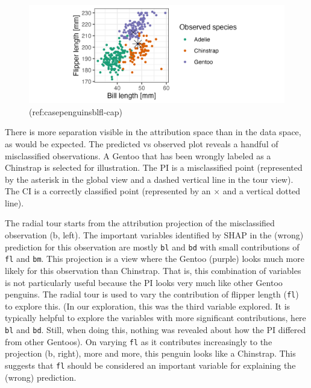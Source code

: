 \documentclass[
]{jss}
\begin{document}
\begin{CodeChunk}
\begin{figure}

{\centering \includegraphics[width=1\linewidth]{./figures/case_penguins_BlFl} 

}

\caption[(ref:casepenguinsblfl-cap)]{(ref:casepenguinsblfl-cap)}\label{fig:casepenguinsblfl}
\end{figure}
\end{CodeChunk}

There is more separation visible in the attribution space than in the
data space, as would be expected. The predicted vs observed plot reveals
a handful of misclassified observations. A Gentoo that has been wrongly
labeled as a Chinstrap is selected for illustration. The PI is a
misclassified point (represented by the asterisk in the global view and
a dashed vertical line in the tour view). The CI is a correctly
classified point (represented by an \(\times\) and a vertical dotted
line).

The radial tour starts from the attribution projection of the
misclassified observation (b, left). The important variables identified
by SHAP in the (wrong) prediction for this observation are mostly
\texttt{bl} and \texttt{bd} with small contributions of \texttt{fl} and
\texttt{bm}. This projection is a view where the Gentoo (purple) looks
much more likely for this observation than Chinstrap. That is, this
combination of variables is not particularly useful because the PI looks
very much like other Gentoo penguins. The radial tour is used to vary
the contribution of flipper length (\texttt{fl}) to explore this. (In
our exploration, this was the third variable explored. It is typically
helpful to explore the variables with more significant contributions,
here \texttt{bl} and \texttt{bd}. Still, when doing this, nothing was
revealed about how the PI differed from other Gentoos). On varying
\texttt{fl} as it contributes increasingly to the projection (b, right),
more and more, this penguin looks like a Chinstrap. This suggests that
\texttt{fl} should be considered an important variable for explaining
the (wrong) prediction.
\end{document}
